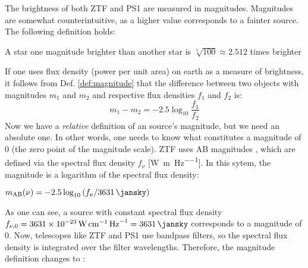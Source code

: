 The brightness of both ZTF and PS1 are measured in magnitudes. Magnitudes are somewhat counterintuitive, as a higher value corresponds to a fainter source. The following definition holds:

\begin{definition}
A star one magnitude brighter than another star is $\sqrt[5]{100} \approx 2.512$ times brighter
\end{definition}
If one uses flux density (power per unit area) on earth as a measure of brightness, it follows from Def. \ref{def:magnitude} that the difference between two objects with magnitudes $m_1$ and $m_2$ and respective flux densities $f_1$ and $f_2$ is:
\begin{equation}
m_1 - m_2 = -2.5 \log_{10}{\frac{f_1}{f_2}}
\end{equation}
Now we have a \textit{relative} definition of an source's magnitude, but we need an absolute one. In other words, one needs to know what constitutes a magnitude of 0 (the zero point of the magnitude scale). ZTF uses AB magnitudes , which are defined via the spectral flux density $f_\nu$ [\unit{\W\per\m\per\Hz}]. In this sytem, the magnitude is a logarithm of the spectral flux density: 

\begin{definition}
$m_{\text{AB}}(\nu) = -2.5 \log_{10}{(f_\nu/\SI{3631}{\jansky})}$
\end{definition}

As one can see, a source with constant spectral flux density $f_{\nu,0} = \SI{3631e-23}{\W\per\cm\per\Hz} = \SI{3631}{\jansky}$ corresponds to a magnitude of 0. Now, telescopes like ZTF and PS1 use bandpass filters, so the spectral flux density is integrated over the filter wavelengths. Therefore, the magnitude definition changes to :


